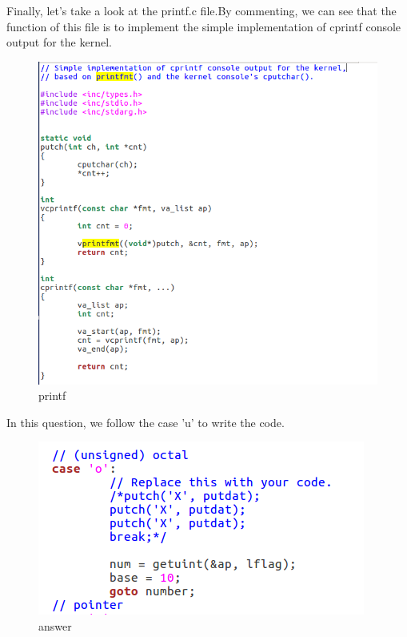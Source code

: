 Finally, let's take a look at the printf.c file.By commenting, we can see that the function of this file is to implement the simple implementation of cprintf console output for the kernel.
\begin{figure}[H]
  \centering
  \includegraphics[width=0.8\linewidth]{figure/printf}
  \caption{printf}\label{2}
\end{figure}

In this question, we follow the case 'u' to write the code.
\begin{figure}[H]
  \centering
  \includegraphics[width=0.8\linewidth]{figure/caseo}
  \caption{answer}\label{2}
\end{figure}

